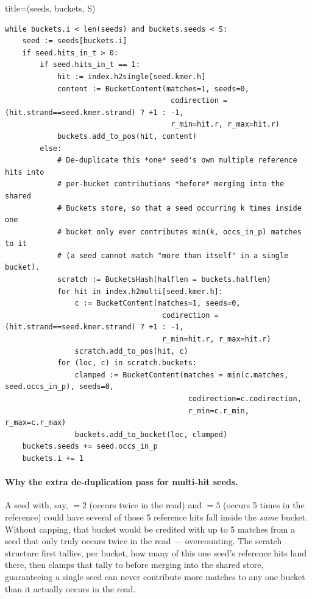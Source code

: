 \begin{algobox}{title={(seeds, buckets, S)}}
\begin{verbatim}
while buckets.i < len(seeds) and buckets.seeds < S:
    seed := seeds[buckets.i]
    if seed.hits_in_t > 0:
        if seed.hits_in_t == 1:
            hit := index.h2single[seed.kmer.h]
            content := BucketContent(matches=1, seeds=0,
                                      codirection = (hit.strand==seed.kmer.strand) ? +1 : -1,
                                      r_min=hit.r, r_max=hit.r)
            buckets.add_to_pos(hit, content)
        else:
            # De-duplicate this *one* seed's own multiple reference hits into
            # per-bucket contributions *before* merging into the shared
            # Buckets store, so that a seed occurring k times inside one
            # bucket only ever contributes min(k, occs_in_p) matches to it
            # (a seed cannot match "more than itself" in a single bucket).
            scratch := BucketsHash(halflen = buckets.halflen)
            for hit in index.h2multi[seed.kmer.h]:
                c := BucketContent(matches=1, seeds=0,
                                    codirection = (hit.strand==seed.kmer.strand) ? +1 : -1,
                                    r_min=hit.r, r_max=hit.r)
                scratch.add_to_pos(hit, c)
            for (loc, c) in scratch.buckets:
                clamped := BucketContent(matches = min(c.matches, seed.occs_in_p), seeds=0,
                                          codirection=c.codirection,
                                          r_min=c.r_min, r_max=c.r_max)
                buckets.add_to_bucket(loc, clamped)
    buckets.seeds += seed.occs_in_p
    buckets.i += 1
\end{verbatim}
\end{algobox}

\paragraph{Why the extra de-duplication pass for multi-hit seeds.} A seed with, say,
$=2$ (occurs twice in the read) and $=5$ (occurs 5 times in
the reference) could have several of those 5 reference hits fall inside the \emph{same} bucket.
Without capping, that bucket would be credited with up to 5 matches from a seed that only truly
occurs twice in the read --- overcounting. The scratch structure first tallies, per bucket, how
many of this one seed's reference hits land there, then clamps that tally to
 before merging into the shared  store, guaranteeing a single
seed can never contribute more matches to any one bucket than it actually occurs in the read.

